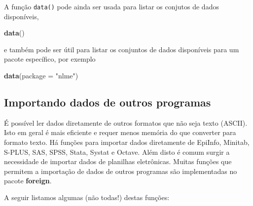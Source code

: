 \documentclass[10pt,a4paper]{book}
\newenvironment{Shaded}{\begin{snugshade}}{\end{snugshade}}
\newcommand{\KeywordTok}[1]{\textcolor[rgb]{0.13,0.29,0.53}{\textbf{#1}}}
\newcommand{\DataTypeTok}[1]{\textcolor[rgb]{0.13,0.29,0.53}{#1}}
\newcommand{\StringTok}[1]{\textcolor[rgb]{0.31,0.60,0.02}{#1}}
\newcommand{\NormalTok}[1]{#1}
\begin{document}
A função \texttt{data()} pode ainda ser usada para listar os conjutos de
dados disponíveis,

\begin{Shaded}
\begin{Highlighting}[]
\KeywordTok{data}\NormalTok{()}
\end{Highlighting}
\end{Shaded}

e também pode ser útil para listar os conjuntos de dados disponíveis
para um pacote específico, por exemplo

\begin{Shaded}
\begin{Highlighting}[]
\KeywordTok{data}\NormalTok{(}\DataTypeTok{package =} \StringTok{"nlme"}\NormalTok{)}
\end{Highlighting}
\end{Shaded}

\subsection{Importando dados de outros
programas}\label{importando-dados-de-outros-programas}

É possível ler dados diretamente de outros formatos que não seja texto
(ASCII). Isto em geral é mais eficiente e requer menos memória do que
converter para formato texto. Há funções para importar dados diretamente
de EpiInfo, Minitab, S-PLUS, SAS, SPSS, Stata, Systat e Octave. Além
disto é comum surgir a necessidade de importar dados de planilhas
eletrônicas. Muitas funções que permitem a importação de dados de outros
programas são implementadas no pacote \textbf{foreign}.

A seguir listamos algumas (não todas!) destas funções:
\end{document}
